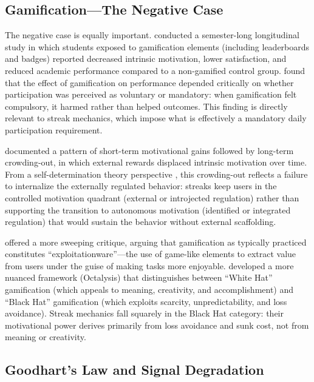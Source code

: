 \documentclass[12pt]{article}
\begin{document}
\subsection{Gamification---The Negative Case}
\label{sec:lit-gamification-negative}

The negative case is equally important. \citet{Hanus2015} conducted a semester-long longitudinal study in which students exposed to gamification elements (including leaderboards and badges) reported decreased intrinsic motivation, lower satisfaction, and reduced academic performance compared to a non-gamified control group. \citet{Mollick2014} found that the effect of gamification on performance depended critically on whether participation was perceived as voluntary or mandatory: when gamification felt compulsory, it harmed rather than helped outcomes. This finding is directly relevant to streak mechanics, which impose what is effectively a mandatory daily participation requirement.

\citet{Dicheva2015} documented a pattern of short-term motivational gains followed by long-term crowding-out, in which external rewards displaced intrinsic motivation over time. From a self-determination theory perspective \citep{Ryan2000}, this crowding-out reflects a failure to internalize the externally regulated behavior: streaks keep users in the controlled motivation quadrant (external or introjected regulation) rather than supporting the transition to autonomous motivation (identified or integrated regulation) that would sustain the behavior without external scaffolding.

\citet{Bogost2011} offered a more sweeping critique, arguing that gamification as typically practiced constitutes ``exploitationware''---the use of game-like elements to extract value from users under the guise of making tasks more enjoyable. \citet{Chou2015} developed a more nuanced framework (Octalysis) that distinguishes between ``White Hat'' gamification (which appeals to meaning, creativity, and accomplishment) and ``Black Hat'' gamification (which exploits scarcity, unpredictability, and loss avoidance). Streak mechanics fall squarely in the Black Hat category: their motivational power derives primarily from loss avoidance and sunk cost, not from meaning or creativity.

\subsection{Goodhart's Law and Signal Degradation}
\label{sec:lit-goodhart}
\end{document}
